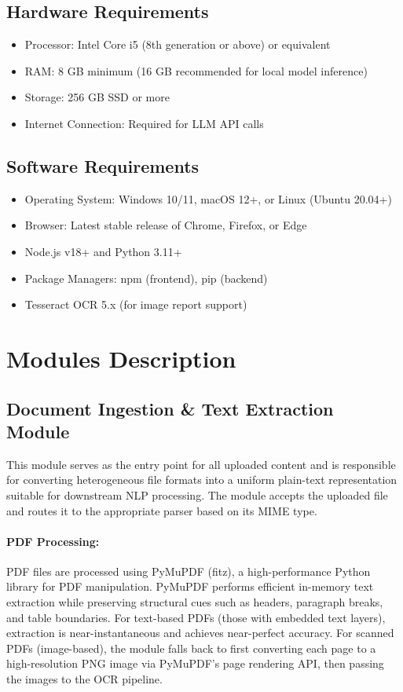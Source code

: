 \subsection{Hardware Requirements}
\begin{itemize}
    \item Processor: Intel Core i5 (8th generation or above) or equivalent
    \item RAM: 8 GB minimum (16 GB recommended for local model inference)
    \item Storage: 256 GB SSD or more
    \item Internet Connection: Required for LLM API calls
\end{itemize}

\subsection{Software Requirements}
\begin{itemize}
    \item Operating System: Windows 10/11, macOS 12+, or Linux (Ubuntu 20.04+)
    \item Browser: Latest stable release of Chrome, Firefox, or Edge
    \item Node.js v18+ and Python 3.11+
    \item Package Managers: npm (frontend), pip (backend)
    \item Tesseract OCR 5.x (for image report support)
\end{itemize}

\section{Modules Description}

\subsection{Document Ingestion \& Text Extraction Module}
This module serves as the entry point for all uploaded content and is responsible for converting heterogeneous file formats into a uniform plain-text representation suitable for downstream NLP processing. The module accepts the uploaded file and routes it to the appropriate parser based on its MIME type.

\paragraph{PDF Processing:}
PDF files are processed using PyMuPDF (fitz), a high-performance Python library for PDF manipulation. PyMuPDF performs efficient in-memory text extraction while preserving structural cues such as headers, paragraph breaks, and table boundaries. For text-based PDFs (those with embedded text layers), extraction is near-instantaneous and achieves near-perfect accuracy. For scanned PDFs (image-based), the module falls back to first converting each page to a high-resolution PNG image via PyMuPDF's page rendering API, then passing the images to the OCR pipeline.

